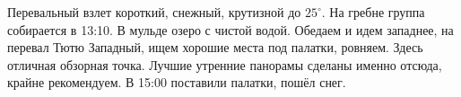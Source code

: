     Перевальный взлет короткий, снежный, крутизной до $25^\circ$. На гребне группа собирается в 13:10. В мульде
    озеро с чистой водой. Обедаем и идем западнее, на перевал Тютю Западный, ищем хорошие места под палатки, ровняем.
    Здесь отличная обзорная точка. Лучшие утренние панорамы сделаны именно отсюда, крайне рекомендуем. В 15:00
    поставили палатки, пошёл снег.

    \FloatBarrier
    
    
    
    
    
    
    
    
    
    
    
    
    
